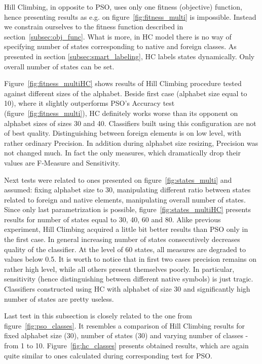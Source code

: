 \documentclass{mini}
\begin{document}
Hill Climbing, in opposite to PSO,  uses only one fitness (objective) function, hence presenting results as e.g. on figure~\ref{fig:fitness_multi} is impossible. Instead we constrain ourselves to the fitness function described in section~\ref{subsec:obj_func}. What is more, in HC model there is no way of specifying number of states corresponding to native and foreign classes. As presented in section \ref{subsec:smart_labeling}, HC labels states dynamically. Only overall number of states can be set.  

Figure~\ref{fig:fitness_multiHC} shows results of Hill Climbing procedure tested against different sizes of the alphabet. Beside first case (alphabet size equal to 10), where it slightly outperforms PSO's Accuracy test (figure~\ref{fig:fitness_multi}), HC definitely works worse than its opponent on alphabet sizes of sizes 30 and 40. Classifiers built using this configuration are not of best quality. Distinguishing between foreign elements is on low level, with rather ordinary Precision. In addition during alphabet size resizing, Precision was not changed much. In fact the only measures, which dramatically drop their values are F-Measure and Sensitivity.

\makeFigureFitnessMultiHC

Next tests were related to ones presented on figure~\ref{fig:states_multi} and assumed: fixing alphabet size to 30, manipulating different ratio between states related to foreign and native elements, manipulating overall number of states. Since only last parametrization is possible, figure~\ref{fig:states_multiHC} presents results for number of states equal to 30, 40, 60 and 80. Alike previous experiment, Hill Climbing acquired a little bit better results than PSO only in the first case. In general increasing number of states consecutively decreases quality of the classifier. At the level of 60 states, all measures are degraded to values below 0.5. It is worth to notice that in first two cases precision remains on rather high level, while all others present themselves poorly. In particular, sensitivity (hence distinguishing between different native symbols) is just tragic. Classifiers constructed using HC with alphabet of size 30 and significantly high number of states are pretty useless.

\makeFigureStateConfigurationMultiHC

Last test in this subsection is closely related to the one from figure~\ref{fig:pso_classes}. It resembles a comparison of  Hill Climbing results for fixed alphabet size (30), number of states (30) and varying number of classes - from 1 to 10. Figure~\ref{fig:hc_classes} presents obtained results, which are again quite similar to ones calculated during corresponding test for PSO.
\end{document}
